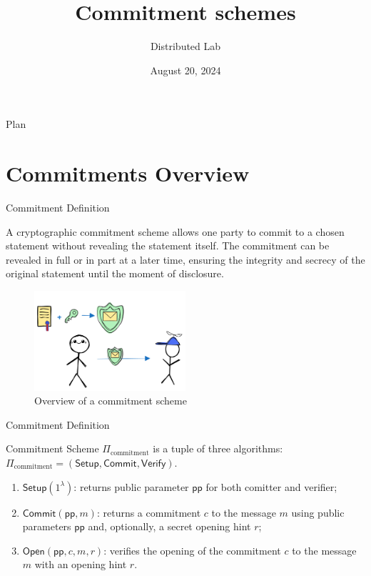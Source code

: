 \documentclass[xcolor={usenames,dvipsnames}]{beamer}
\title[Commitment schemes]{\textbf{Commitment schemes}}
\author{Distributed Lab}
\date{August 20, 2024}
\begin{document}
	\frame {
		\titlepage
	}
 
	\begin{frame}{Plan}
        \tableofcontents
    \end{frame}

	\section{Commitments Overview}

    \begin{frame}{Commitment Definition}
        \begin{definition}
            A cryptographic commitment scheme allows one party to commit to a chosen statement without revealing the statement itself. 
            The commitment can be revealed in full or in part at a later time, ensuring the integrity and secrecy of the original statement until 
            the moment of disclosure.
        \end{definition}

        \begin{figure}
            \centering
            \includegraphics[width=0.5\textwidth]{images/lecture_5/CommitmentExample.png}
            \caption{Overview of a commitment scheme}
        \end{figure}
    \end{frame}

    \begin{frame}{Commitment Definition}
        \begin{definition}
            Commitment Scheme $\Pi_{\text{commitment}}$ is a tuple of three algorithms: $\Pi_{\text{commitment}} = (\mathsf{Setup}, \mathsf{Commit}, \mathsf{Verify})$.

            \begin{enumerate}

                \item $\mathsf{Setup} (1^{\lambda})$: returns public parameter $\mathsf{pp}$ for both comitter and verifier;
        
                \item  $\mathsf{Commit} (\mathsf{pp}, m)$: returns a commitment $c$ to the message $m$ using public parameters $\mathsf{pp}$ and, optionally, a secret opening hint $r$;
        
                \item  $\mathsf{Open} (\mathsf{pp}, c, m, r)$: verifies the opening of the commitment $c$ to the message $m$ with an opening hint $r$. 
            \end{enumerate}
        \end{definition}

    \end{frame}
\end{document}
